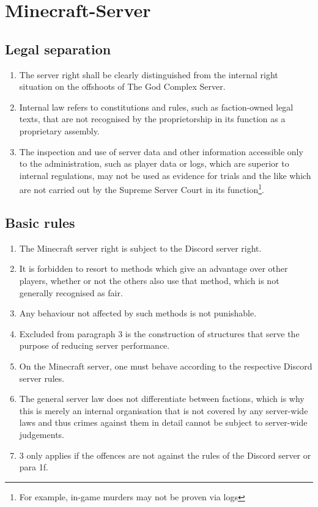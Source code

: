\documentclass{article}
\begin{document}
\section{Minecraft-Server}

\subsection{Legal separation}
\begin{enumerate}[(1)]
	\item The server right shall be clearly distinguished from the internal right situation on the offshoots of The God Complex Server.
	\item Internal law refers to constitutions and rules, such as faction-owned legal texts, that are not recognised by the proprietorship in its function as a proprietary assembly.
	\item The inspection and use of server data and other information accessible only to the administration, such as player data or logs, which are superior to internal regulations, may not be used as evidence for trials and the like which are not carried out by the Supreme Server Court in its function\footnote{For example, in-game murders may not be proven via logs}.
\end{enumerate}

\subsection{Basic rules}
\begin{enumerate}[(1)]
	\item The Minecraft server right is subject to the Discord server right.
	\item It is forbidden to resort to methods which give an advantage over other players, whether or not the others also use that method, which is not generally recognised as fair.
	\item Any behaviour not affected by such methods is not punishable.
	\item Excluded from paragraph 3 is the construction of structures that serve the purpose of reducing server performance.
	\item On the Minecraft server, one must behave according to the respective Discord server rules.
	\item The general server law does not differentiate between factions, which is why this is merely an internal organisation that is not covered by any server-wide laws and thus crimes against them in detail cannot be subject to server-wide judgements.
	\item 3 only applies if the offences are not against the rules of the Discord server or para 1f.
\end{enumerate}
\end{document}
